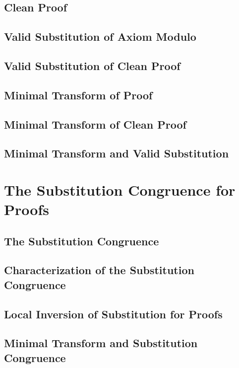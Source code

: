 \documentclass{report}
\begin{document}
    \subsection{Clean Proof}
      
    \subsection{Valid Substitution of Axiom Modulo}
      
    \subsection{Valid Substitution of Clean Proof}
      
    \subsection{Minimal Transform of Proof}
      
    \subsection{Minimal Transform of Clean Proof}
      
    \subsection{Minimal Transform and Valid Substitution}
      
\section{The Substitution Congruence for Proofs}
    \subsection{The Substitution Congruence}
      
    \subsection{Characterization of the Substitution Congruence}
      
    \subsection{Local Inversion of Substitution for Proofs}
      
    \subsection{Minimal Transform and Substitution Congruence}
      
\end{document}
